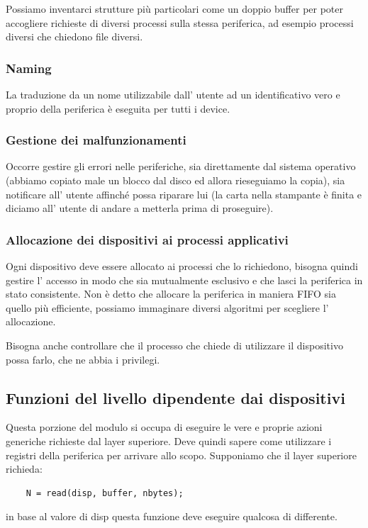 Possiamo inventarci strutture più particolari come un doppio buffer per poter accogliere richieste di diversi processi sulla stessa periferica, ad esempio processi diversi che chiedono file diversi.

\subsubsection{Naming}
La traduzione da un nome utilizzabile dall' utente ad un identificativo vero e proprio della periferica è eseguita per tutti i device.

\subsubsection{Gestione dei malfunzionamenti}
Occorre gestire gli errori nelle periferiche, sia direttamente dal sistema operativo (abbiamo copiato male un blocco dal disco ed allora rieseguiamo la copia), sia notificare all' utente affinché possa riparare lui (la carta nella stampante è finita e diciamo all' utente di andare a metterla prima di proseguire).

\subsubsection{Allocazione dei dispositivi ai processi applicativi}
Ogni dispositivo deve essere allocato ai processi che lo richiedono, bisogna quindi gestire l' accesso in modo che sia mutualmente esclusivo e che lasci la periferica in stato consistente.
Non è detto che allocare la periferica in maniera FIFO sia quello più efficiente, possiamo immaginare diversi algoritmi per scegliere l' allocazione.

Bisogna anche controllare che il processo che chiede di utilizzare il dispositivo possa farlo, che ne abbia i privilegi.

\subsection{Funzioni del livello dipendente dai dispositivi}
Questa porzione del modulo si occupa di eseguire le vere e proprie azioni generiche richieste dal layer superiore.
Deve quindi sapere come utilizzare i registri della periferica per arrivare allo scopo.
Supponiamo che il layer superiore richieda:
\begin{verbatim}
    N = read(disp, buffer, nbytes);
\end{verbatim}
in base al valore di disp questa funzione deve eseguire qualcosa di differente.

